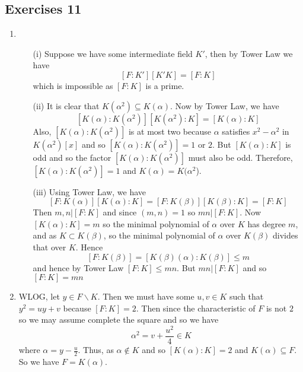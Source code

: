 \subsection{Exercises 11}
\begin{enumerate}
\item \begin{enumerate}
      \item[(i)] Suppose we have some intermediate field $K'$, then by Tower Law we have
      $$[F:K'][K'K]=[F:K]$$ which is impossible as $[F:K]$ is a prime.\\
      \item[(ii)] It is clear that $K(\alpha^2) \subseteq K(\alpha)$. Now by Tower Law, we have
      $$[K(\alpha):K(\alpha^2)][K(\alpha^2):K]=[K(\alpha):K]$$
      Also, $[K(\alpha):K(\alpha^2)]$ is at most two because $\alpha$ satisfies $x^2-\alpha^2$ in $K(\alpha^2)[x]$ and so $[K(\alpha):K(\alpha^2)]=1$ or $2$. But
      $[K(\alpha):K]$ is odd and so the factor $[K(\alpha):K(\alpha^2)]$ must also be odd. Therefore,
      $[K(\alpha):K(\alpha^2)]=1$ and $K(\alpha)=K(\alpha^2$).\\
      \item[(iii)] Using Tower Law, we have
     $$[F:K(\alpha)][K(\alpha):K]=[F:K(\beta)][K(\beta):K]=[F:K]$$
     Then $m,n|[F:K]$ and since $(m,n)=1$ so $mn|[F:K]$.
     Now $[K(\alpha):K]=m$ so the minimal polynomial of $\alpha$ over $K$ has degree $m$, and as $K \subset K(\beta)$, so the minimal polynomial of $\alpha$ over $K(\beta)$ divides that over $K$. Hence
     $$[F:K(\beta)]=[K(\beta)(\alpha):K(\beta)] \le m$$
     and hence by Tower Law $[F:K] \le mn$. But $mn|[F:K]$ and so $[F:K]=mn$
      \end{enumerate}
\item WLOG, let $y \in F\backslash K$. Then we must have some $u,v \in K$ such that
     $y^2=uy+v$ because $[F:K]=2$. Then since the characteristic of $F$ is not $2$ so we may assume complete the square and so we have
     $$\alpha^2=v+\frac{u^2}{4} \in K$$ where $\alpha=y-\frac{u}{2}$. Thus, as $\alpha \not \in K$ and so
     $[K(\alpha):K]=2$ and $K(\alpha) \subseteq F$. So we have $F=K(\alpha)$.


\end{enumerate}

